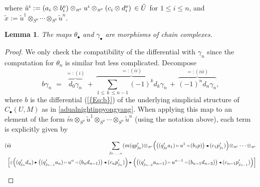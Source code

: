\documentclass[reqno, a4paper, 10pt]{amsart}
\numberwithin{equation}{section}
\theoremstyle{plain}
\newtheorem{lem}[theorem]{Lemma}
\theoremstyle{definition}
\theoremstyle{remark}
\begin{document}
where $\tilde{u}^i := (a_i \otimes b^o_i) \otimes_{{\scriptscriptstyle{{R^{\rm e}}}}} u^i \otimes_{{\scriptscriptstyle{{R^{\rm e}}}}} (c_i \otimes d^o_i) \,\in {\tilde{{U}}}$ 
for $1 \leq i \leq n$, and
$\tilde{x}:= \tilde{u}^1 \otimes_{{\scriptscriptstyle{{S^{o}}}}} \cdots \otimes_{{\scriptscriptstyle{{S^{o}}}}} \tilde{u}^n$.

\begin{lem}
\label{revell}
The maps $\theta_{{\scriptscriptstyle{\bullet}}}$ and $\gamma_{{\scriptscriptstyle{\bullet}}}$ are morphisms of chain complexes. 
\end{lem}

\begin{proof}
We only check the compatibility of the differential with $\gamma_n$ since the computation for $\theta_n$ is similar but less complicated. 
Decompose
$$
b\gamma_n\,\,=\,\, \overset{=:(i)}{\overbrace{d_0\gamma_n}} \,+\, \overset{=:(ii)}{\overbrace{\sum_{1\leq \, k\,  \leq n-1} (-1)^k d_k \gamma_n}} \,+\, \overset{=:(iii)}{\overbrace{(-1)^n d_n\gamma_n}},
$$ 
where $b$ is the differential {{\rm (}\ref{{Eq:b}}{\rm )}} of the underlying simplicial structure of $C_{{\scriptscriptstyle{\bullet}}}({U}, {M})$ as in \eqref{adualnightinpyongyang}. 
When applying this map to an element of the form 
${\tilde{{m}}}{\otimes_{\scriptscriptstyle{{S^{{{o}}}}}}}{\tilde{{u}}}^1{\otimes_{\scriptscriptstyle{{S^{{{o}}}}}}}\cdots{\otimes_{\scriptscriptstyle{{\scriptscriptstyle{{S^{o}}}}}}}{\tilde{{u}}}^n$ 
(using the notation above), each term is explicitly given by 
\begin{footnotesize}
\begin{eqnarray*} 
(i) &\!\!\!\!\!\!=&\!\!\!\!\!\! \underset{j_{0,\, \ldots,n}}{\sum}  (m(qp_{j_0}') {\otimes_{\scriptscriptstyle{{\scriptscriptstyle{{R^{\rm e}}}}}}}\Big( {\big( {(q_{j_0}'a_1){{\,\raise1pt\hbox{$\scriptscriptstyle{\rhd}$} \, }} u^1{{\,\raise1pt\hbox{$\scriptscriptstyle{\lhd}$} \, }}(b_1p)} \big)}{{\,\raise1pt\hbox{$\scriptscriptstyle{\blacktriangleleft}$} \, }} (c_1p_{j_1}')\Big) {\otimes_{\scriptscriptstyle{{\scriptscriptstyle{{R^{\rm e}}}}}}}\cdots  {\otimes_{\scriptscriptstyle{{\scriptscriptstyle{{R^{\rm e}}}}}}} 
\\ 
&\!\!\!\!\!\!\!\!\!\! &\!\!\!\!
\!\!\!\!\!\! {\left[\underset{}{} { \varepsilon\Big( (q_{j_n}'d_n){{\,\raise1pt\hbox{$\scriptscriptstyle{\blacktriangleright}$} \, }} {\big( {(q_{j_{n-1}}'a_n){{\,\raise1pt\hbox{$\scriptscriptstyle{\rhd}$} \, }} u^n{{\,\raise1pt\hbox{$\scriptscriptstyle{\lhd}$} \, }}(b_nd_{n-1})} \big)}{{\,\raise1pt\hbox{$\scriptscriptstyle{\blacktriangleleft}$} \, }}(c_np_{j_n}')\Big) {{\,\raise1pt\hbox{$\scriptscriptstyle{\blacktriangleright}$} \, }} \Big( {\big( {(q_{j_{n-2}}'a_{n-1}){{\,\raise1pt\hbox{$\scriptscriptstyle{\rhd}$} \, }} u^{n-1}{{\,\raise1pt\hbox{$\scriptscriptstyle{\lhd}$} \, }}(b_{n-1}d_{n-2})} \big)}{{\,\raise1pt\hbox{$\scriptscriptstyle{\blacktriangleleft}$} \, }}(c_{n-1}p_{j_{n-1}}') \Big)} \right]} 

\end{eqnarray*}
\end{footnotesize}
\end{proof}
\end{document}
